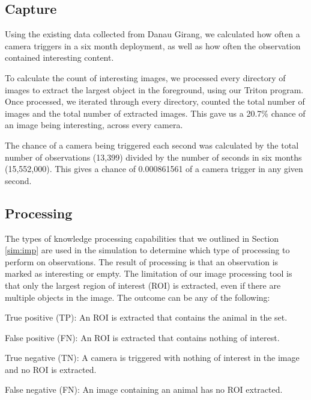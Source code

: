 \subsection{Capture}
	Using the existing data collected from Danau Girang, we calculated how often a camera triggers in a six month deployment, as well as how often the observation contained interesting content. 
	
	To calculate the count of interesting images, we processed every directory of images to extract the largest object in the foreground, using our Triton program. Once processed, we iterated through every directory, counted the total number of images and the total number of extracted images. This gave us a 20.7\% chance of an image being interesting, across every camera.
	
	The chance of a camera being triggered each second was calculated by the total number of observations (13,399) divided by the number of seconds in six months (15,552,000). This gives a chance of 0.000861561 of a camera trigger in any given second.
	
\subsection{Processing}
	The types of knowledge processing capabilities that we outlined in Section \ref{sim:imp} are used in the simulation to determine which type of processing to perform on observations. The result of processing is that an observation is marked as interesting or empty. The limitation of our image processing tool is that only the largest region of interest (ROI) is extracted, even if there are multiple objects in the image. The outcome can be any of the following:
		\begin{description}
			\item True positive (TP): An ROI is extracted that contains the animal in the set.
			\item False positive (FN): An ROI is extracted that contains nothing of interest.
			\item True negative (TN): A camera is triggered with nothing of interest in the image and no ROI is extracted.
			\item False negative (FN): An image containing an animal has no ROI extracted.
		\end{description}
	
